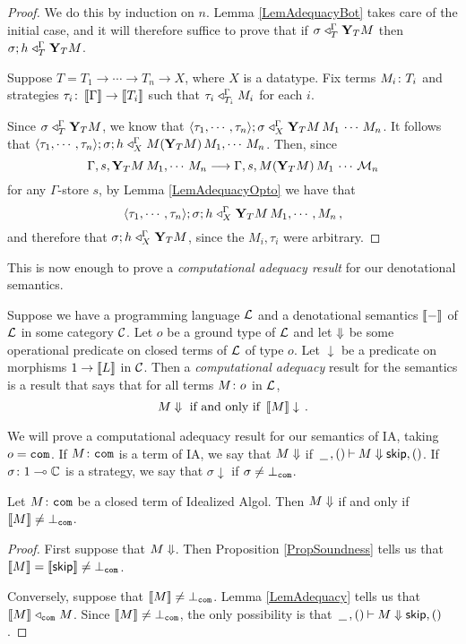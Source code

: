 \documentclass[11pt]{report}
\begin{document}
\begin{proof}
  We do this by induction on $n$.  
  Lemma \ref{LemAdequacyBot} takes care of the initial case, and it will therefore suffice to prove that if $\sigma\mathrel{\triangleleft}_T^\Gamma \mathbf{Y}_T M$ then $\sigma;h\mathrel{\triangleleft}_T^\Gamma \mathbf{Y}_T M$.

  Suppose $T=T_1\to \cdots\to T_n \to X$, where $X$ is a datatype.
  Fix terms $M_i\colon T_i$ and strategies $\tau_i\colon \left\llbracket\Gamma\right\rrbracket\to \left\llbracket T_i\right\rrbracket$ such that $\tau_i\mathrel{\triangleleft}_{T_i}^\Gamma M_i$ for each $i$.

  Since $\sigma\mathrel{\triangleleft}_T^\Gamma \mathbf{Y}_T M$, we know that $\langle \tau_1,\cdots,\tau_n\rangle;\sigma \mathrel{\triangleleft}_X^\Gamma \mathbf{Y}_T M\,M_1\,\cdots\,M_n$.
  It follows that $\langle \tau_1,\cdots,\tau_n\rangle;\sigma;h \mathrel{\triangleleft}_X^\Gamma M(\mathbf{Y}_T M)\,M_1,\cdots\,M_n$.  
  Then, since
  \[
    \Gamma,s,\mathbf{Y}_T M\,M_1,\cdots\,M_n\longrightarrow\Gamma,s,M(\mathbf{Y}_T M)\,M_1\,\cdots\,\mathcal M_n
    \]
  for any $\Gamma$-store $s$, by Lemma \ref{LemAdequacyOpto} we have that
  \[
    \langle\tau_1,\cdots,\tau_n\rangle;\sigma;h \mathrel{\triangleleft}_X^\Gamma \mathbf{Y}_T M\,M_1,\cdots,M_n\,,
    \]
  and therefore that $\sigma;h\mathrel{\triangleleft}_X^\Gamma \mathbf{Y}_T M$, since the $M_i,\tau_i$ were arbitrary.
\end{proof}

This is now enough to prove a \emph{computational adequacy result} for our denotational semantics.

\begin{definition}
  Suppose we have a programming language $\mathcal L$ and a denotational semantics $\left\llbracket-\right\rrbracket$ of $\mathcal L$ in some category ${\mathcal{C}}$.  
  Let $o$ be a ground type of $\mathcal L$ and let $\Downarrow$ be some operational predicate on closed terms of $\mathcal L$ of type $o$.  
  Let $\downarrow$ be a predicate on morphisms $1 \to \left\llbracket L\right\rrbracket$ in ${\mathcal{C}}$.  
  Then a \emph{computational adequacy} result for the semantics is a result that says that for all terms $M\colon o$ in $\mathcal L$, 
  \[
    M\Downarrow \text{ if and only if } \left\llbracket M\right\rrbracket\downarrow\,.
    \]
\end{definition}

We will prove a computational adequacy result for our semantics of IA, taking $o={\mathtt{com}}$.  
If $M\colon{\mathtt{com}}$ is a term of IA, we say that $M\Downarrow$ if $\,\underline{\hspace{1.5ex}}\,,()\mathbin{\vdash} M\Downarrow {\mathsf{skip}},()$.
If $\sigma\colon 1 \multimap \mathbb{C}$ is a strategy, we say that $\sigma\downarrow$ if $\sigma\ne\bot_{{\mathtt{com}}}$.

\begin{theorem}
  Let $M\colon{\mathtt{com}}$ be a closed term of Idealized Algol.
  Then $M\Downarrow$ if and only if $\left\llbracket M\right\rrbracket\ne\bot_{{\mathtt{com}}}$.
  \label{TheComputationalAdequacyIA}
\end{theorem}
\begin{proof}
  First suppose that $M\Downarrow$.  
  Then Proposition \ref{PropSoundness} tells us that $\left\llbracket M\right\rrbracket = \left\llbracket{\mathsf{skip}}\right\rrbracket\ne\bot_{{\mathtt{com}}}$.

  Conversely, suppose that $\left\llbracket M\right\rrbracket\ne\bot_{{\mathtt{com}}}$.  
  Lemma \ref{LemAdequacy} tells us that $\left\llbracket M\right\rrbracket\mathrel{\triangleleft}_{{\mathtt{com}}} M$.  
  Since $\left\llbracket M\right\rrbracket\ne\bot_{{\mathtt{com}}}$, the only possibility is that $\,\underline{\hspace{1.5ex}}\,,()\mathbin{\vdash} M\Downarrow{\mathsf{skip}},()$.
\end{proof}
\end{document}
